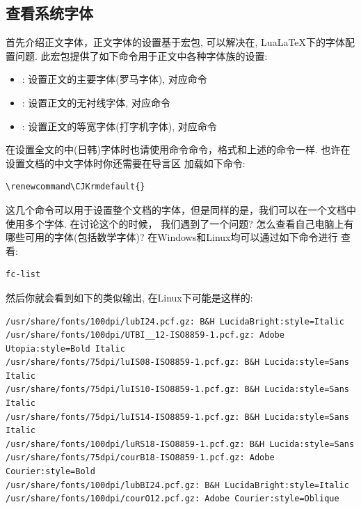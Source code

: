 \subsection{查看系统字体}
首先介绍正文字体，正文字体的设置基于宏包, 可以解决在\XeLaTeX{}, Lua\LaTeX{}下的字体配置问题.
此宏包提供了如下命令用于正文中各种字体族的设置\index{\cmd{\setmainfont}}\index{\cmd{\setsansfont}}\index{\cmd{\setmonofont}}:
\begin{itemize}
    \item \cmd{\setmainfont}: 设置正文的主要字体(罗马字体), 对应命令\cmd{\textrm}
    \item \cmd{\setsansfont}: 设置正文的无衬线字体, 对应命令\cmd{\textsf}
    \item \cmd{\setmonofont}: 设置正文的等宽字体(打字机字体), 对应命令\cmd{\texttt}
\end{itemize}

\begin{leftbar}
在设置全文的中(日韩)字体时也请使用命令\cmd{\setCJKmainfont}命令，格式和上述的命令一样. 也许在设置文档的中文字体时你还需要在导言区
加载如下命令:
\end{leftbar}
\begin{verbatim}
\renewcommand\CJKrmdefault{}
\end{verbatim}

这几个命令可以用于设置整个文档的字体，但是同样的是，我们可以在一个文档中使用多个字体. 在讨论这个的时候，
我们遇到了一个问题? 怎么查看自己电脑上有哪些可用的字体(包括数学字体)? 在Windows和Linux均可以通过如下命令进行
查看:
\begin{verbatim}
fc-list 
\end{verbatim}

然后你就会看到如下的类似输出, 在Linux下可能是这样的:
\begin{verbatim}
/usr/share/fonts/100dpi/lubI24.pcf.gz: B&H LucidaBright:style=Italic
/usr/share/fonts/100dpi/UTBI__12-ISO8859-1.pcf.gz: Adobe Utopia:style=Bold Italic
/usr/share/fonts/75dpi/luIS08-ISO8859-1.pcf.gz: B&H Lucida:style=Sans Italic
/usr/share/fonts/75dpi/luIS10-ISO8859-1.pcf.gz: B&H Lucida:style=Sans Italic
/usr/share/fonts/75dpi/luIS14-ISO8859-1.pcf.gz: B&H Lucida:style=Sans Italic
/usr/share/fonts/100dpi/luRS18-ISO8859-1.pcf.gz: B&H Lucida:style=Sans
/usr/share/fonts/75dpi/courB18-ISO8859-1.pcf.gz: Adobe Courier:style=Bold
/usr/share/fonts/100dpi/lubBI24.pcf.gz: B&H LucidaBright:style=Italic
/usr/share/fonts/100dpi/courO12.pcf.gz: Adobe Courier:style=Oblique
\end{verbatim}

